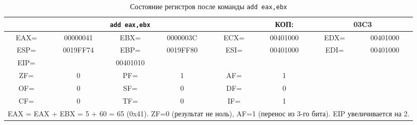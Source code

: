 \begin{table}[H]
    \centering
    \caption{Состояние регистров после команды \texttt{add eax,ebx}}
    \label{tab:after_add}
    \small
    \renewcommand{\arraystretch}{1.3}
    \begin{tabular}{|c|c|c|c|c|c|c|c|}
    \hline
    \multicolumn{5}{|c|}{\cellcolor{green!40}\textbf{\texttt{add eax,ebx}}} & \cellcolor{green!20} КОП: & \multicolumn{2}{c|}{\cellcolor{green!20} 03C3} \\
    \hline
    \cellcolor{blue!30} EAX= & \cellcolor{red!70} 00000041 & \cellcolor{blue!30} EBX= & 0000003C & \cellcolor{blue!30} ECX= & 00401000 & \cellcolor{blue!30} EDX= & 00401000 \\
    \hline
    \cellcolor{blue!30} ESP= & 0019FF74 & \cellcolor{blue!30} EBP= & 0019FF80 & \cellcolor{blue!30} ESI= & 00401000 & \cellcolor{blue!30} EDI= & 00401000 \\
    \hline
    \cellcolor{blue!30} EIP= & \multicolumn{3}{c|}{\cellcolor{red!70} 00401010} & \multicolumn{4}{c|}{} \\
    \hline
    \cellcolor{pink} ZF= & \cellcolor{red!70} 0 & \cellcolor{pink} PF= & 1 & \cellcolor{pink} AF= & \cellcolor{red!70} 1 & \multicolumn{2}{c|}{\cellcolor{gray!50}} \\
    \cline{1-6}
    \cellcolor{pink} OF= & 0 & \cellcolor{pink} SF= & 0 & \cellcolor{pink} DF= & 0 & \multicolumn{2}{c|}{\cellcolor{gray!50}} \\
    \cline{1-6}
    \cellcolor{pink} CF= & 0 & \cellcolor{pink} TF= & 0 & \cellcolor{pink} IF= & 1 & \multicolumn{2}{c|}{\cellcolor{gray!50}} \\
    \hline
    \multicolumn{8}{|p{14cm}|}{EAX = EAX + EBX = 5 + 60 = 65 (0x41). ZF=0 (результат не ноль), AF=1 (перенос из 3-го бита). EIP увеличивается на 2.} \\
    \hline
    \end{tabular}
\end{table}

